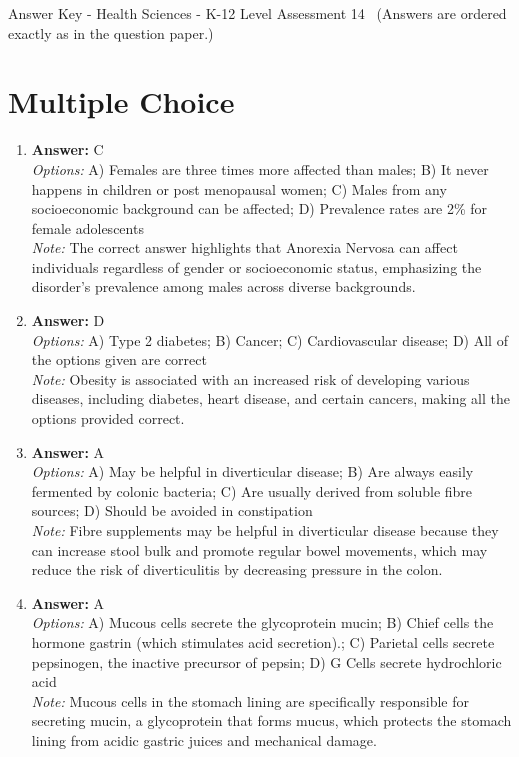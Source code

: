 \documentclass[12pt]{article}
\begin{document}
\begin{center}
Answer Key - Health Sciences - K-12 Level Assessment 14 \
\small (Answers are ordered exactly as in the question paper.)
\end{center}

\section*{Multiple Choice}
\begin{enumerate}[label=\arabic*.]
\item \textbf{Answer:} C
\\ \textit{Options:} A) Females are three times more affected than males; B) It never happens in children or post menopausal women; C) Males from any socioeconomic background can be affected; D) Prevalence rates are 2\% for female adolescents
\\ \textit{Note:} The correct answer highlights that Anorexia Nervosa can affect individuals regardless of gender or socioeconomic status, emphasizing the disorder's prevalence among males across diverse backgrounds.
\item \textbf{Answer:} D
\\ \textit{Options:} A) Type 2 diabetes; B) Cancer; C) Cardiovascular disease; D) All of the options given are correct
\\ \textit{Note:} Obesity is associated with an increased risk of developing various diseases, including diabetes, heart disease, and certain cancers, making all the options provided correct.
\item \textbf{Answer:} A
\\ \textit{Options:} A) May be helpful in diverticular disease; B) Are always easily fermented by colonic bacteria; C) Are usually derived from soluble fibre sources; D) Should be avoided in constipation
\\ \textit{Note:} Fibre supplements may be helpful in diverticular disease because they can increase stool bulk and promote regular bowel movements, which may reduce the risk of diverticulitis by decreasing pressure in the colon.
\item \textbf{Answer:} A
\\ \textit{Options:} A) Mucous cells secrete the glycoprotein mucin; B) Chief cells the hormone gastrin (which stimulates acid secretion).; C) Parietal cells secrete pepsinogen, the inactive precursor of pepsin; D) G Cells secrete hydrochloric acid
\\ \textit{Note:} Mucous cells in the stomach lining are specifically responsible for secreting mucin, a glycoprotein that forms mucus, which protects the stomach lining from acidic gastric juices and mechanical damage.

\end{enumerate}
\end{document}
